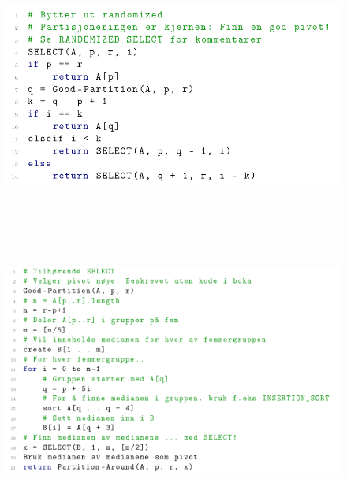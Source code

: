 \documentclass[12pt]{report}
\begin{document}
\begin{figure}[H]
	\begin{Center}
		\includegraphics[width=5.56in,height=2.97in]{./media/image179.png}
	\end{Center}
\end{figure}



\par


\vspace{\baselineskip}



\begin{figure}[H]
	\begin{Center}
		\includegraphics[width=6.3in,height=3.88in]{./media/image180.png}
	\end{Center}
\end{figure}
\end{document}
